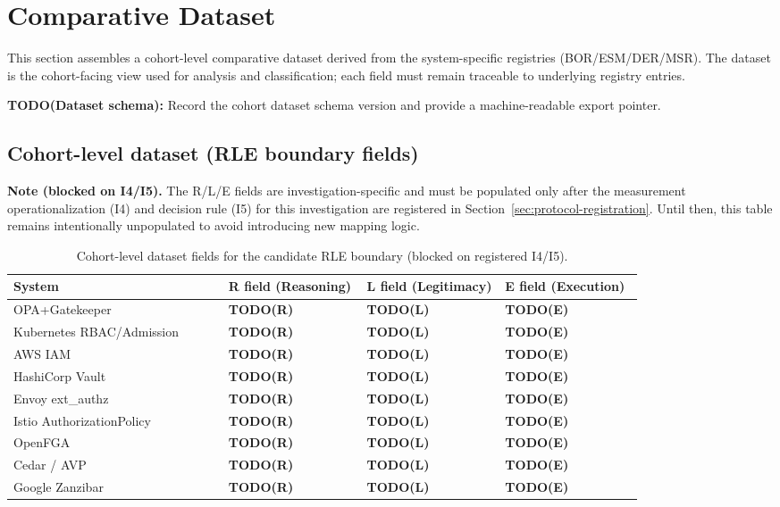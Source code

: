 \section{Comparative Dataset}
\label{sec:comparative-dataset}
This section assembles a cohort-level comparative dataset derived from the system-specific registries (BOR/ESM/DER/MSR). The dataset is the cohort-facing view used for analysis and classification; each field must remain traceable to underlying registry entries.

\textbf{TODO(Dataset schema):} Record the cohort dataset schema version and provide a machine-readable export pointer.

\subsection{Cohort-level dataset (RLE boundary fields)}
\textbf{Note (blocked on I4/I5).} The R/L/E fields are investigation-specific and must be populated only after the measurement operationalization (I4) and decision rule (I5) for this investigation are registered in Section~\ref{sec:protocol-registration}. Until then, this table remains intentionally unpopulated to avoid introducing new mapping logic.

\begin{table}[ht]
\centering
\begin{tabular}{@{}p{0.28\linewidth}p{0.18\linewidth}p{0.18\linewidth}p{0.18\linewidth}@{}}
\toprule
System & R field (Reasoning) & L field (Legitimacy) & E field (Execution) \\
\midrule
OPA+Gatekeeper & \textbf{TODO(R)} & \textbf{TODO(L)} & \textbf{TODO(E)} \\
Kubernetes RBAC/Admission & \textbf{TODO(R)} & \textbf{TODO(L)} & \textbf{TODO(E)} \\
AWS IAM & \textbf{TODO(R)} & \textbf{TODO(L)} & \textbf{TODO(E)} \\
HashiCorp Vault & \textbf{TODO(R)} & \textbf{TODO(L)} & \textbf{TODO(E)} \\
Envoy ext\_authz & \textbf{TODO(R)} & \textbf{TODO(L)} & \textbf{TODO(E)} \\
Istio AuthorizationPolicy & \textbf{TODO(R)} & \textbf{TODO(L)} & \textbf{TODO(E)} \\
OpenFGA & \textbf{TODO(R)} & \textbf{TODO(L)} & \textbf{TODO(E)} \\
Cedar / AVP & \textbf{TODO(R)} & \textbf{TODO(L)} & \textbf{TODO(E)} \\
Google Zanzibar & \textbf{TODO(R)} & \textbf{TODO(L)} & \textbf{TODO(E)} \\
\bottomrule
\end{tabular}
\caption{Cohort-level dataset fields for the candidate RLE boundary (blocked on registered I4/I5).}
\end{table}

